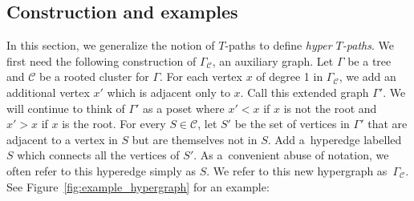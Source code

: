 \documentclass[10pt,a4paper]{amsart}
\numberwithin{equation}{section}
\begin{document}
\subsection{Construction and examples}\label{sec:gen-T-paths}
In this section, we generalize the notion of $T$-paths to define \emph{hyper $T$-paths}. We first need the following construction of $\Gamma_{\mathcal{C}}$, an auxiliary graph.
Let $\Gamma$ be a tree and $\mathcal{C}$ be a rooted cluster for $\Gamma$. For each vertex $x$ of degree 1 in $\Gamma_{\mathcal{C}}$, we add an additional vertex $x'$ which is adjacent only to $x$. Call this extended graph $\Gamma'$. We will continue to think of $\Gamma'$ as a poset where $x'<x$ if $x$ is not the root and $x'>x$ if $x$ is the root. For every $S\in\mathcal{C}$, let $S'$ be the set of vertices in $\Gamma'$ that are adjacent to a vertex in $S$ but are themselves not in $S$. Add a~hyperedge labelled $S$ which connects all the vertices of $S'$. As a~convenient abuse of notation, we often refer to this hyperedge simply as $S$. We refer to this new hypergraph as~$\Gamma_{\mathcal{C}}$. See Figure~\ref{fig:example_hypergraph} for an example:
\end{document}
